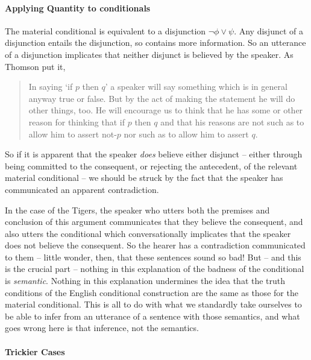 \paragraph{Applying Quantity to conditionals}
  
The material conditional is equivalent to a disjunction $\neg \phi \vee \psi$. Any disjunct of a disjunction entails the disjunction, so contains more information. So an utterance of a disjunction implicates that neither disjunct is believed by the speaker. As Thomson put it, \begin{quote}
	In saying ‘if $p$ then $q$’ a speaker will say something which is in general anyway true or false. But by the act of making the statement he will do other things, too. He will encourage us to think that he has some or other reason for thinking that if $p$ then $q$ and that his reasons are not such as to allow him to assert not-$p$ nor such as to allow him to assert $q$. \citep[67–8]{thomson}
\end{quote}So if it is apparent that the speaker \emph{does} believe either disjunct – either through being committed to the consequent, or rejecting the antecedent, of the relevant material conditional – we should be struck by the fact that the speaker has communicated an apparent contradiction. 


In the case of the Tigers, the speaker who utters both the premises and conclusion of this argument communicates that they believe the consequent, and also utters the conditional which conversationally implicates that the speaker does not believe the consequent. So the hearer has a contradiction communicated to them – little wonder, then, that these sentences sound so bad! But – and this is the crucial part – nothing in this explanation of the badness of the conditional is \emph{semantic}. Nothing in this explanation undermines the idea that the truth conditions of the English conditional construction are the same as those for the material conditional. This is all to do with what we standardly take ourselves to be able to infer from an utterance of a sentence with those semantics, and what goes wrong here is that inference, not the semantics.

\paragraph{Trickier Cases}

